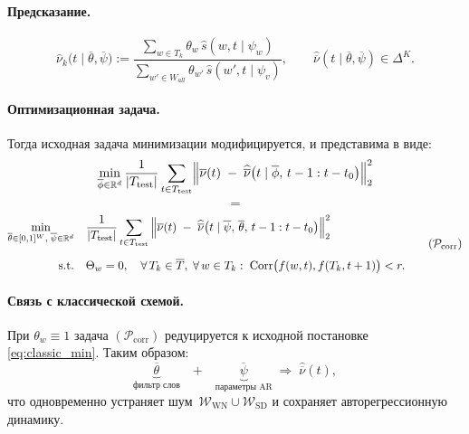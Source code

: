 \documentclass[14pt,a4paper]{article}
\begin{document}
\paragraph{Предсказание.}
\[
  \widehat\nu_k\!\bigl(t\mid\overline\theta,\overline\psi\bigr)
  :=
  \frac{\displaystyle\sum_{w\in T_k}\theta_w\,\widehat s(w,t\mid\psi_w)}
       {\displaystyle\sum_{{w'} \in W_{all}}\theta_{w'}\,\widehat s({w'},t\mid\psi_v)},
  \qquad
  \widehat{\overline{\nu}}(t\mid\overline\theta,\overline\psi)\in\Delta^{K}.
\]


\paragraph{Оптимизационная задача.}
Тогда исходная задача минимизации модифицируется, и представима в виде:
\[
  \min_{\overline{\phi}\in\mathbb R^{d}}
  \frac{1}{\lvert T_{\mathrm{test}}\rvert}
  \sum_{t\in T_{\mathrm{test}}}
    \Bigl\|
      \overline{\nu}(t)
      \;-\;
      \widehat{\overline{\nu}}\bigl(t \mid \overline{\phi},\,t-1:t-t_0\bigr)
    \Bigr\|_{2}^{2}
\]
\[
  =
\]
\[
  \begin{aligned}
    \min_{\overline{\theta}\in[0,1]^{W},\;\overline{\psi}\in\mathbb R^{d}}\quad &
    \frac{1}{\lvert T_{\mathrm{test}}\rvert}
    \sum_{t\in T_{\mathrm{test}}}
      \left\|
        \overline{\nu}(t)
        \;-\;
        \widehat{\overline{\nu}}\bigl(t \mid \overline{\psi},\,\overline{\theta},\,t-1:t-t_0\bigr)
      \right\|_{2}^{2}
    \\[6pt]
    \text{s.t.}\quad &
      \Theta_{w} = 0,\quad
      \forall\,T_k\in\overline{T},\;
      \forall\,w\in T_k:\;\operatorname{Corr}\bigl(f(w,t),f(T_k,t+1)\bigr)<r.
  \end{aligned}
  \tag{$\mathcal P_{\mathrm{corr}}$}
\]


\paragraph{Связь с классической схемой.}
При $\theta_w\equiv1$ задача $(\mathcal P_{\mathrm{corr}})$
редуцируется к исходной постановке \eqref{eq:classic_min}.  
Таким образом:
\[
  \underbrace{\overline{\theta}}_{\text{фильтр слов}}
  \quad\text{+}\quad
  \underbrace{\overline{\psi}}_{\text{параметры AR}}
  \;\Longrightarrow\;
  \widehat{\overline{\nu}}(t),
\]
что одновременно устраняет шум~$\mathcal W_{\mathrm{WN}}\cup\mathcal W_{\mathrm{SD}}$
и сохраняет авторегрессионную динамику.

\end{document}
